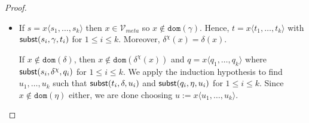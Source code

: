 \documentclass{lmcs}
\theoremstyle{theorem}\newtheorem{theorem}{Theorem}
\theoremstyle{theorem}\newtheorem{lemma}[theorem]{Lemma}
\theoremstyle{theorem}\newtheorem{corollary}[theorem]{Corollary}
\theoremstyle{definition}\newtheorem{definition}[theorem]{Definition}
\theoremstyle{definition}\newtheorem{example}[theorem]{Example}
\newcommand{\Vmeta}{\mathcal{V}_{\mathit{meta}}}
\newcommand{\FV}{\mathit{FV}}
\newcommand{\domain}{\mathtt{dom}}
\newcommand{\avar}{x}
\newcommand{\bvar}{y}
\newcommand{\cvar}{z}
\newcommand{\abs}[2]{\lambda #1.#2}
\newcommand{\meta}[2]{#1\langle#2\rangle}
\begin{document}
\begin{proof}
{\begin{itemize}
\begin{itemize}
\begin{itemize}
\begin{itemize}
            \item if $w \in \domain(\gamma) \setminus \{\avar\}$ then $\delta_1(w) = \chi(w) =
              \delta^\chi(w) = \delta_2(w)$
            \item if $w \in \domain(\delta) \setminus (\domain(\gamma) \cup \{\avar\})$ then
              $\delta_1(w) = \delta^{\bvar_1:=\cvar}(w) = \delta(w)$ (**), $= \delta^\chi(w) =
              \delta_2(w)$, where (**) holds because $w \neq \bvar_1$:
              if $w = \bvar_1$, then $\bvar_1 \in \FV(\gamma(\bvar_1))$, contradicting the
              earlier assumption on $\bvar_1$
            \end{itemize}
          \item hence, by Lemma \ref{lem:substextend}, also $\subrel{s',\delta',q'}$
        \end{itemize}
      \end{itemize}
      \ \\
      Hence, by the induction hypothesis there exists $u'$ such that
      $\subrel{t', \delta^{\bvar_1:=\cvar}, u'}$ and $\subrel{q',\eta^{\bvar_2:=\cvar}, u'}$.
      We are done choosing $u := \abs{\cvar}{u}$.
    \item If $s = \meta{\avar}{s_1,\dots,s_k}$ then $\avar \in \Vmeta$ so $\avar \notin
      \domain(\gamma)$.  Hence, $t = \meta{\avar}{t_1,\dots,t_k}$ with $\mathsf{subst}(s_i,\gamma,t_i)$ for
      $1 \leq i \leq k$.  Moreover, $\delta^\chi(\avar) = \delta(\avar)$.
    
      If $\avar \notin \domain(\delta)$, then $\avar \notin \domain(\delta^\chi(\avar))$ and
      $q = \meta{\avar}{q_1,\dots,q_k}$ where $\mathsf{subst}(s_i,\delta^\chi,q_i)$ for $1 \leq i \leq k$.
      We apply the induction hypothesis to find $u_1,\dots,u_k$ such that
      $\mathsf{subst}(t_i,\delta,u_i)$ and $\mathsf{subst}(q_i,\eta,u_i)$ for $1 \leq i \leq k$.
      Since $\avar \notin \domain(\eta)$ either, we are done choosing $u := \meta{\avar}{u_1,\dots,
      u_k}$.
    

\end{itemize}}
\end{proof}
\end{document}
